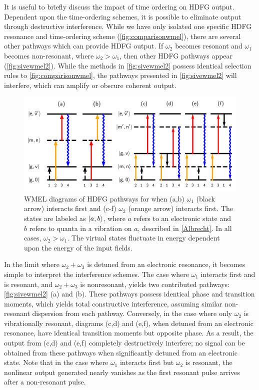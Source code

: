 \documentclass[aip, jcp, reprint, onecolumn, nofootinbib]{revtex4-2}
\begin{document}
It is useful to briefly discuss the impact of time ordering on HDFG output.
Dependent upon the time-ordering schemes, it is possible to eliminate output through destructive interference.\cite{Cho2008}
While we have only isolated one specific HDFG resonance and time-ordering scheme (\autoref{fig:comparisonwmel}), there are several other pathways which can provide HDFG output. \cite{RN352}
If $\omega_2$ becomes resonant and $\omega_1$ becomes non-resonant, where $\omega_2 > \omega_1$, then other HDFG pathways appear (\autoref{fig:sivewmel2}).\cite{McDonnell2024} 
While the methods in \autoref{fig:sivewmel2} possess identical selection rules to \autoref{fig:comparisonwmel}, the pathways presented in \autoref{fig:sivewmel2} will interfere, which can amplify or obscure coherent output.
\begin{figure}[!htbp]
	\centering
	\includegraphics[width=\textwidth]{figures/timeorderedwmel.png}
	\caption{WMEL diagrams of HDFG pathways for when (a,b) $\omega_1$ (black arrow) interacts first and (c-f) $\omega_2$ (orange arrow) interacts first. 
		The states are labeled as $\ket{a,b}$, where $a$ refers to an electronic state and $b$ refers to quanta in a vibration on $a$, described in \autoref{Albrecht}.
		In all cases, $\omega_2 > \omega_1$.
		The virtual states fluctuate in energy dependent upon the energy of the input fields.
	}
	\label{fig:sivewmel2}
\end{figure}

In the limit where $\omega_2+\omega_3$ is detuned from an electronic resonance, it becomes simple to interpret the interference schemes. 
The case where $\omega_1$ interacts first and is resonant, and $\omega_2 + \omega_3$ is nonresonant, yields two contributed pathways: \autoref{fig:sivewmel2} (a) and (b).
These pathways possess identical phase and transition moments, which yields total constructive interference, assuming similar non-resonant dispersion from each pathway.
Conversely, in the case where only $\omega_2$ is vibrationally resonant, diagrams (c,d) and (e,f), when detuned from an electronic resonance, have identical transition moments but opposite phase. 
As a result, the output from (c,d) and (e,f) completely destructively interfere; no signal can be obtained from these pathways when significantly detuned from an electronic state. \cite{McDonnell2024}
Note that in the case where $\omega_1$ interacts first but $\omega_2$ is resonant, the nonlinear output generated nearly vanishes as the first resonant pulse arrives after a non-resonant pulse.
\end{document}
